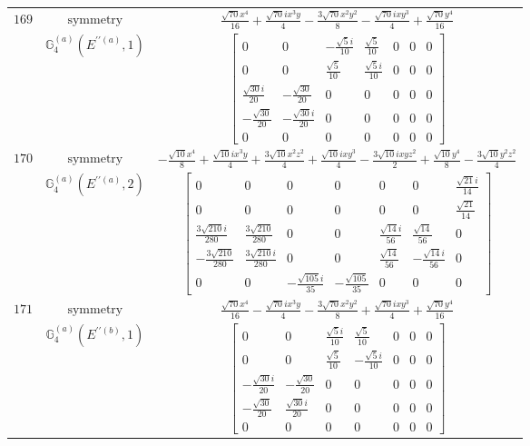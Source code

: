 \documentclass[fleqn,8pt,landscape]{jsarticle}
\begin{document}
\begin{longtable}{ccc}
$ 169 $ & $ \text{symmetry} $ & $ \frac{\sqrt{70} x^{4}}{16} + \frac{\sqrt{70} i x^{3} y}{4} - \frac{3 \sqrt{70} x^{2} y^{2}}{8} - \frac{\sqrt{70} i x y^{3}}{4} + \frac{\sqrt{70} y^{4}}{16} $ \\
$  $ & $ \mathbb{G}_{4}^{(a)}(E^{\prime\prime(a)},1) $ & $ \begin{bmatrix} 0 & 0 & - \frac{\sqrt{5} i}{10} & \frac{\sqrt{5}}{10} & 0 & 0 & 0 \\ 0 & 0 & \frac{\sqrt{5}}{10} & \frac{\sqrt{5} i}{10} & 0 & 0 & 0 \\ \frac{\sqrt{30} i}{20} & - \frac{\sqrt{30}}{20} & 0 & 0 & 0 & 0 & 0 \\ - \frac{\sqrt{30}}{20} & - \frac{\sqrt{30} i}{20} & 0 & 0 & 0 & 0 & 0 \\ 0 & 0 & 0 & 0 & 0 & 0 & 0 \end{bmatrix} $ \\ \hline
$ 170 $ & $ \text{symmetry} $ & $ - \frac{\sqrt{10} x^{4}}{8} + \frac{\sqrt{10} i x^{3} y}{4} + \frac{3 \sqrt{10} x^{2} z^{2}}{4} + \frac{\sqrt{10} i x y^{3}}{4} - \frac{3 \sqrt{10} i x y z^{2}}{2} + \frac{\sqrt{10} y^{4}}{8} - \frac{3 \sqrt{10} y^{2} z^{2}}{4} $ \\
$  $ & $ \mathbb{G}_{4}^{(a)}(E^{\prime\prime(a)},2) $ & $ \begin{bmatrix} 0 & 0 & 0 & 0 & 0 & 0 & \frac{\sqrt{21} i}{14} \\ 0 & 0 & 0 & 0 & 0 & 0 & \frac{\sqrt{21}}{14} \\ \frac{3 \sqrt{210} i}{280} & \frac{3 \sqrt{210}}{280} & 0 & 0 & \frac{\sqrt{14} i}{56} & \frac{\sqrt{14}}{56} & 0 \\ - \frac{3 \sqrt{210}}{280} & \frac{3 \sqrt{210} i}{280} & 0 & 0 & \frac{\sqrt{14}}{56} & - \frac{\sqrt{14} i}{56} & 0 \\ 0 & 0 & - \frac{\sqrt{105} i}{35} & - \frac{\sqrt{105}}{35} & 0 & 0 & 0 \end{bmatrix} $ \\ \hline
$ 171 $ & $ \text{symmetry} $ & $ \frac{\sqrt{70} x^{4}}{16} - \frac{\sqrt{70} i x^{3} y}{4} - \frac{3 \sqrt{70} x^{2} y^{2}}{8} + \frac{\sqrt{70} i x y^{3}}{4} + \frac{\sqrt{70} y^{4}}{16} $ \\
$  $ & $ \mathbb{G}_{4}^{(a)}(E^{\prime\prime(b)},1) $ & $ \begin{bmatrix} 0 & 0 & \frac{\sqrt{5} i}{10} & \frac{\sqrt{5}}{10} & 0 & 0 & 0 \\ 0 & 0 & \frac{\sqrt{5}}{10} & - \frac{\sqrt{5} i}{10} & 0 & 0 & 0 \\ - \frac{\sqrt{30} i}{20} & - \frac{\sqrt{30}}{20} & 0 & 0 & 0 & 0 & 0 \\ - \frac{\sqrt{30}}{20} & \frac{\sqrt{30} i}{20} & 0 & 0 & 0 & 0 & 0 \\ 0 & 0 & 0 & 0 & 0 & 0 & 0 \end{bmatrix} $ \\ \hline

\end{longtable}
\end{document}

